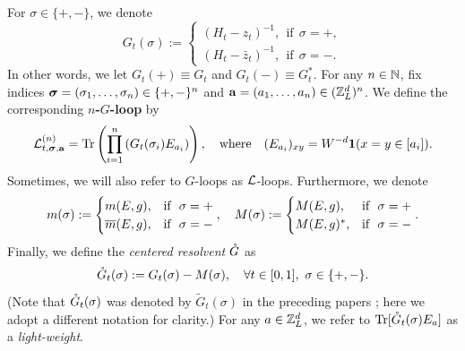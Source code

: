 \begin{definition}[$G$-loop]\label{Def:G_loop}
For $\sigma\in \{+,-\}$, we denote 
 \begin{equation}\nonumber
  G_{t}(\sigma):=\begin{cases}
       (H_t-z_t)^{-1}, \ \ \text{if} \ \  \sigma=+,\\
        (H_t-\bar z_t)^{-1}, \ \ \text{if} \ \ \sigma=-.
   \end{cases}
 \end{equation}
In other words, we let $G_{t}(+)\equiv G_{t}$ and $G_{t}(-)\equiv G_{t}^*$. %
For any $n\in \mathbb{N}$, fix indices ${\boldsymbol{\sigma}}=(\sigma_1, \ldots, \sigma_n)\in \{+,-\}^n$ and ${\mathbf{a}}=(a_1, \ldots, a_n)\in ({\mathbb Z}_L^d)^n$. We define the corresponding {\bf $n$-$G$-loop} by 
\begin{equation}\label{Eq:defGLoop}
    {\mathcal L}^{(n)}_{t, {\boldsymbol{\sigma}}, {\mathbf{a}}}= \operatorname{Tr} \left({\prod_{i=1}^n \left(G_{t}(\sigma_i) E_{a_i}\right) }\right), \quad \text{where} \quad (E_{a_i})_{xy} = W^{-d}\mathbf 1(x=y\in [a_i]).
\end{equation}
Sometimes, we will also refer to $G$-loops as $\mathcal L$-loops. Furthermore, we denote 
\begin{equation}\label{def_mtzk}
m (\sigma ):= \begin{cases}
    m(E,g),  &\text{if} \ \ \sigma  =+ \\
    \overline m(E,g),  &\text{if} \ \ \sigma = -
\end{cases}, \quad M (\sigma ):= \begin{cases}
     M(E,g) ,  &\text{if} \ \ \sigma  =+ \\
     M(E,g)^*,  &\text{if} \ \ \sigma = -
 \end{cases}.
\end{equation}
Finally, we define the \emph{centered resolvent} ${\mathring G}$ as
\begin{equation}\label{Eq:defwtG}
 \Gc_t(\sigma) := G_t(\sigma) - M(\sigma),\quad \forall t\in[0,1], \ \sig\in \{+,-\} .
\end{equation}
(Note that ${\mathring G}_t(\sigma)$ was denoted by $\widetilde{G}_t(\sigma)$ in the preceding papers \cite{YY_25, DYYY25}; here we adopt a different notation for clarity.) 
For any $a\in {\mathbb Z}_L^d$, we refer to $\operatorname{Tr}[{\mathring G}_t(\sigma) E_a]$ as a \emph{light-weight}.
\end{definition}





